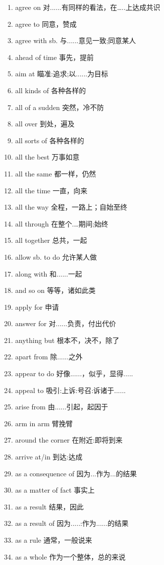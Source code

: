 \documentclass[a4paper,11pt,twocolumn]{ctexart}
\begin{document}
\begin{enumerate}[label=\arabic*., itemsep=0pt, parsep=2pt, topsep=5pt]
    \item agree on 对......有同样的看法，在…..上达成共识
    \item agree to 同意，赞成
    \item agree with sb. 与......意见一致;同意某人
    \item ahead of time 事先，提前
    \item aim at 瞄准:追求;以......为目标
    \item all kinds of 各种各样的
    \item all of a sudden 突然，冷不防
    \item all over 到处，遍及
    \item all sorts of 各种各样的
    \item all the best 万事如意
    \item all the same 都一样，仍然
    \item all the time 一直，向来
    \item all the way 全程，一路上；自始至终
    \item all through 在整个.…期间;始终
    \item all together 总共，一起
    \item allow sb. to do 允许某人做
    \item along with 和......一起
    \item and so on 等等，诸如此类
    \item apply for 申请
    \item answer for 对......负责，付出代价
    \item anything but 根本不，决不，除了
    \item apart from 除......之外
    \item appear to do 好像......，似乎，显得.....
    \item appeal to 吸引:上诉:号召:诉诸于......
    \item arise from 由......引起，起因于
    \item arm in arm 臂挽臂
    \item around the corner 在附近:即将到来
    \item arrive at/in 到达:达成
    \item as a consequence of 因为...作为...的结果
    \item as a matter of fact 事实上
    \item as a result 结果，因此
    \item as a result of 因为.....:作为......的结果
    \item as a rule 通常，一般说来
    \item as a whole 作为一个整体，总的来说

\end{enumerate}
\end{document}
